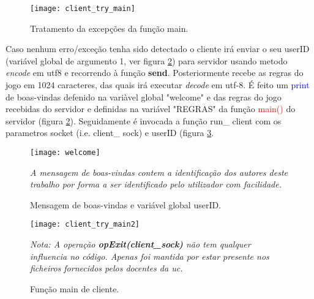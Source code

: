 \begin{figure}[H]
	\centering
	\texttt{[image: client\_try\_main]}
	\caption{Tratamento da excepções da função main.\\}
	\label{fig:client_try_main}
	\flushleft\small\textit{}
\end{figure} 

\clearpage

Caso nenhum erro/exceção tenha sido detectado o cliente irá enviar o seu userID (variável global de argumento 1, ver figura \ref{fig:welcome}) para servidor usando metodo \textsl{encode} em \ac{utf8} e recorrendo à função \textbf{send}. Posteriormente recebe as regras do jogo em 1024 caracteres, das quais irá executar \textsl{decode} em \ac{utf-8}. É feito um \textcolor{blue}{print} de boas-vindas defenido na variàvel global "welcome" e das regras do jogo recebidas do servidor e definidas na variável "REGRAS" da função \textcolor{red}{main()} do servidor (figura \ref{fig:welcome}). Seguidamente é invocada a função run\_ client com os parametros socket (i.e. client\_ sock) e userID (figura \ref{fig:client_try_main2}.\\

\begin{figure}[H]
	\centering
	\texttt{[image: welcome]}
	\caption{Mensagem de boas-vindas e variável global userID.\\}
	\label{fig:welcome}
	\flushleft\small\textit{A mensagem de boas-vindas contem a identificação dos autores deste trabalho por forma a ser identificado pelo utilizador com facilidade.}
\end{figure} 

\begin{figure}[H]
	\centering
	\texttt{[image: client\_try\_main2]}
	\caption{Função main de cliente.\\}
	\label{fig:client_try_main2}
	\flushleft\small\textit{Nota: A operação \textbf{opExit(client\_sock)} não tem qualquer influencia no código. Apenas foi mantida por estar presente nos ficheiros fornecidos pelos docentes da \ac{uc}.}
\end{figure} 

\newpage

